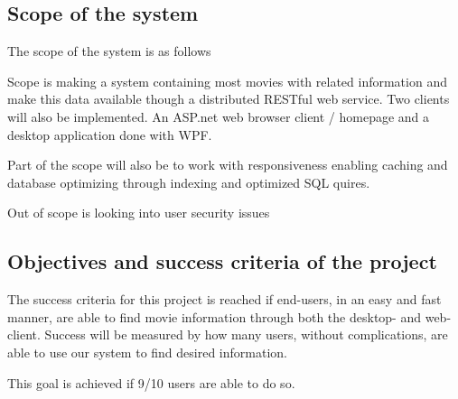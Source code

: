 

\subsection{Scope of the system}

The scope of the system is as follows

Scope is making a system containing most movies with related information and make this data available though a distributed RESTful web service. Two clients will also be implemented. An ASP.net web browser client / homepage and a desktop application done with WPF.

Part of the scope will also be to work with responsiveness enabling caching and database optimizing through indexing and optimized SQL quires.

Out of scope is looking into user security issues


\subsection{Objectives and success criteria of the project}


The success criteria for this project is reached if end-users, in an easy and fast manner, are able to find movie information through both the desktop- and web-client. Success will be measured by how many users, without complications, are able to use our system to find desired information.

This goal is achieved if 9/10 users are able to do so.


